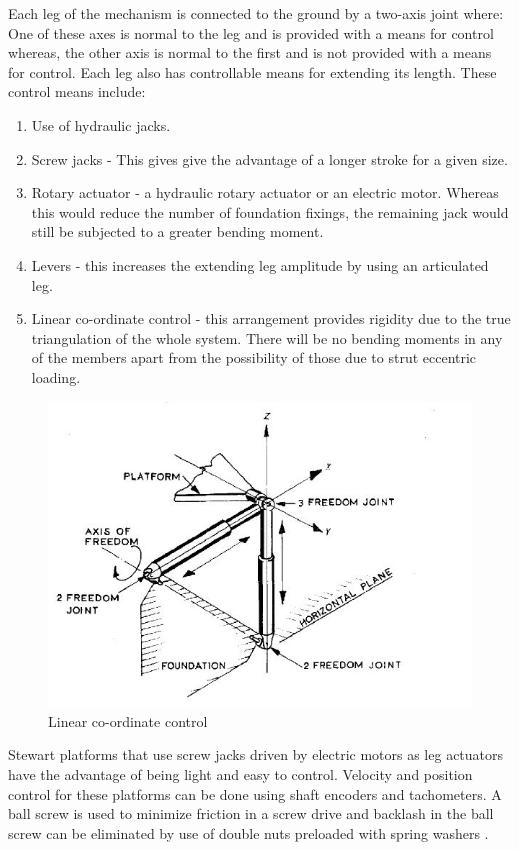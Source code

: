 Each leg of the mechanism is connected to the ground by a two-axis joint where: One of these axes is
normal to the leg and is provided with a means for control whereas, the other axis is normal to the first and is not provided with a means for control.
Each leg also has controllable means for extending its length. These control means include:
\begin{enumerate}
\item Use of hydraulic jacks.
\item Screw jacks - This gives give the advantage of
a longer stroke for a given size.
\item Rotary actuator - a hydraulic rotary actuator or an electric motor. Whereas this would reduce the number of foundation fixings, the remaining jack would still be subjected to a greater bending moment.
\item Levers - this increases the extending leg amplitude by using an articulated leg.
\item Linear co-ordinate control - this arrangement provides rigidity due to the true triangulation of
the whole system. There will be no bending moments in any of the members apart from the possibility of those due to strut eccentric loading. 
\end{enumerate}
\begin{center}
	\begin{figure}[!h]
	\centering
	\includegraphics[width=0.6\linewidth]{Figures/Fig11}
	\caption[Linear co-ordinate control]{Linear co-ordinate control \cite{stewart1965platform}}
	\end{figure}
\end{center}

Stewart platforms that use screw jacks driven by electric motors as leg actuators have the advantage of being light and easy to control. Velocity and position control for these platforms can be done using shaft encoders and tachometers. A ball screw is used to minimize friction in a screw drive and backlash in the ball screw can be eliminated by use of double nuts preloaded with spring washers \cite{fichter1986stewart}.

